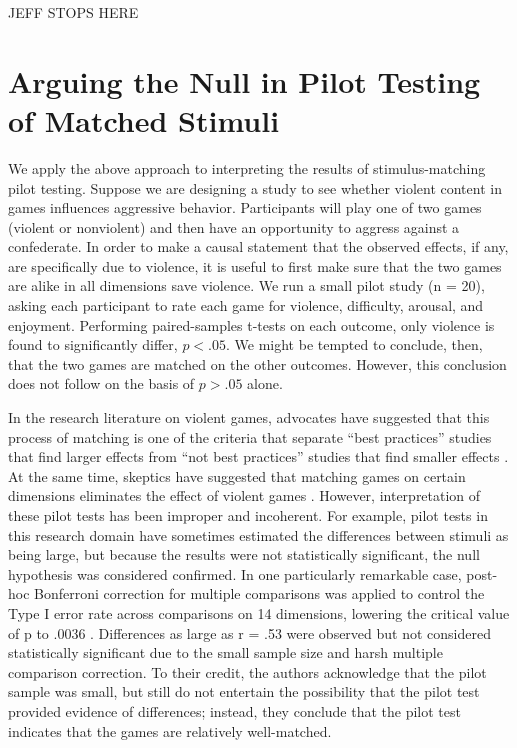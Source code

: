 \documentclass[fignum,nobf,man]{apa}
\begin{document}
JEFF STOPS HERE

\section{Arguing the Null in Pilot Testing of Matched Stimuli}
We apply the above approach to interpreting the results of stimulus-matching pilot testing.  Suppose we are designing a study to see whether violent content in games influences aggressive behavior. Participants will play one of two games (violent or nonviolent) and then have an opportunity to aggress against a confederate. In order to make a causal statement that the observed effects, if any, are specifically due to violence, it is useful to first make sure that the two games are alike in all dimensions save violence. We run a small pilot study (n = 20), asking each participant to rate each game for violence, difficulty, arousal, and enjoyment. Performing paired-samples t-tests on each outcome, only violence is found to significantly differ, $p < .05$. We might be tempted to conclude, then, that the two games are matched on the other outcomes. However, this conclusion does not follow on the basis of $p > .05$ alone.

In the research literature on violent games, advocates have suggested that this process of matching is one of the criteria that separate ``best practices'' studies that find larger effects from ``not best practices'' studies that find smaller effects \citep{Anderson:etal:2010}. At the same time, skeptics have suggested that matching games on certain dimensions eliminates the effect of violent games \citep{Adachi:Willoughby:2011}. However, interpretation of these pilot tests has been improper and incoherent. For example, pilot tests in this research domain have sometimes estimated the differences between stimuli as being large, but because the results were not statistically significant, the null hypothesis was considered confirmed. In one particularly remarkable case, post-hoc Bonferroni correction for multiple comparisons was applied to control the Type I error rate across comparisons on 14 dimensions, lowering the critical value of p to .0036 \citep{Arriaga:etal:2008}. Differences as large as r = .53 were observed but not considered statistically significant due to the small sample size and harsh multiple comparison correction. To their credit, the authors acknowledge that the pilot sample was small, but still do not entertain the possibility that the pilot test provided evidence of differences; instead, they conclude that the pilot test indicates that the games are relatively well-matched.
\end{document}
